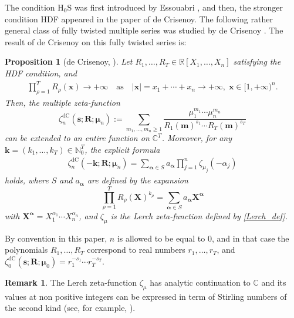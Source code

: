 \documentclass[a4paper,12pt]{article}
\newtheorem{prop}[thm]{Proposition}
\theoremstyle{definition}
\newtheorem{rem}[thm]{Remark}
\numberwithin{equation}{section}
\def\C{{\mathbb C}}
\newcommand{\dc}{\mathrm{dC}}
\begin{document}
The condition $\mathrm{H_0S}$ was first introduced by Essouabri \cite{Esso97}, and then, the stronger
condition HDF appeared in the paper \cite{dC} of de Crisenoy.
The following rather general class of fully twisted multiple series was studied by de Crisenoy \cite{dC}. The result of de Crisenoy on this fully twisted series is:
\begin{prop}
[{de Crisenoy, \cite[Theorems A \& B]{dC}}]
\label{thm_dC}
Let $R_1,\ldots,R_T \in \mathbb{R} [X_1,\ldots,X_n]$ satisfying the HDF condition, and 
\begin{align}\label{HDFadd}
\prod_{\rho=1}^T R_{\rho}(\mathbf{x})\to +\infty \quad \text{as} \quad
|\mathbf{x}|=x_1+\cdots+x_n\to +\infty, \;\mathbf{x}\in [1,+\infty)^n.
\end{align}
Then, the multiple zeta-function
\begin{equation}
    \zeta_{n}^{\dc}(\mathbf{s};\mathbf{R};\boldsymbol{\mu}_n) := \sum_{m_1,\ldots,m_n \geq 1} \frac{\mu_1^{m_1} \cdots \mu_n^{m_n}}{R_1(\mathbf{m})^{s_1} \cdots R_T(\mathbf{m})^{s_T}} \label{eq:def_zeta_de_crisenoy}
\end{equation}
can be extended to an entire function on $\mathbb{C}^T$.   Moreover, for any 
$\mathbf{k}=(k_1,\ldots,k_T)\in \mathbb{N}_0^T$, the explicit formula
\begin{align}\label{dC_result}
\zeta_{n}^{\dc}(-\mathbf{k};\mathbf{R};\boldsymbol{\mu}_n)=\sum_{\boldsymbol{\alpha}\in S}
a_{\boldsymbol{\alpha}}\prod_{j=1}^n \zeta_{\mu_j}(-\alpha_j)
\end{align}
holds,
where $S$ and $a_{\boldsymbol{\alpha}}$ are defined by the expansion
$$\prod_{\rho=1}^T R_{\rho}(\mathbf{X})^{k_\rho}=\sum_{\boldsymbol{\alpha}\in S}a_{\boldsymbol{\alpha}}
\mathbf{X}^{\boldsymbol{\alpha}}
$$
with $\mathbf{X}^{\boldsymbol{\alpha}}=X_1^{\alpha_1}\cdots X_n^{\alpha_n}$, and 
$\zeta_{\mu}$ is the Lerch zeta-function defined by \eqref{Lerch_def}.
\end{prop}

By convention in this paper, $n$ is allowed to be equal to $0$, and in that case the polynomials $R_1,\ldots,R_T$ correspond to real numbers $r_1,\ldots,r_T$, and $\zeta_{0}^{\dc}(\mathbf{s};\mathbf{R};\boldsymbol{\mu}_0) = r_1^{-s_1} \cdots r_T^{-s_T}.$

\begin{rem}
The Lerch zeta-function $\zeta_{\mu}$ has analytic continuation to $\C$ and its values at non positive integers can be expressed in term of Stirling numbers of the second kind (see, for example, \cite[Lemma 5.7]{dC}).
\end{rem}
\end{document}
